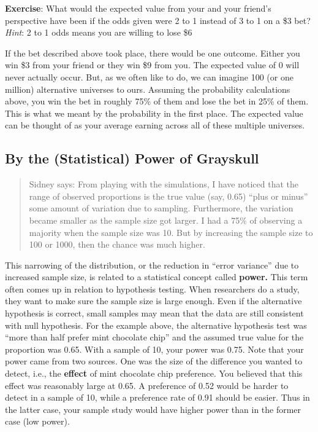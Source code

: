\documentclass[
  openany]{book}
\begin{document}
\textbf{Exercise}: What would the expected value from your and your friend's perspective have been if the odds given were 2 to 1 instead of 3 to 1 on a \$3 bet? \emph{Hint}: 2 to 1 odds means you are willing to lose \$6

If the bet described above took place, there would be one outcome. Either you win \$3 from your friend or they win \$9 from you. The expected value of 0 will never actually occur. But, as we often like to do, we can imagine 100 (or one million) alternative universes to ours. Assuming the probability calculations above, you win the bet in roughly 75\% of them and lose the bet in 25\% of them. This is what we meant by the probability in the first place. The expected value can be thought of as your average earning across all of these multiple universes.

\hypertarget{by-the-statistical-power-of-grayskull}{%
\subsection*{By the (Statistical) Power of Grayskull}\label{by-the-statistical-power-of-grayskull}}

\begin{quote}
Sidney says: From playing with the simulations, I have noticed that the range of observed proportions is the true value (say, 0.65) ``plus or minus'' some amount of variation due to sampling. Furthermore, the variation became smaller as the sample size got larger. I had a 75\% of observing a majority when the sample size was 10. But by increasing the sample size to 100 or 1000, then the chance was much higher.
\end{quote}

This narrowing of the distribution, or the reduction in ``error variance'' due to increased sample size, is related to a statistical concept called \textbf{power.} This term often comes up in relation to hypothesis testing. When researchers do a study, they want to make sure the sample size is large enough. Even if the alternative hypothesis is correct, small samples may mean that the data are still consistent with null hypothesis. For the example above, the alternative hypothesis test was ``more than half prefer mint chocolate chip'' and the assumed true value for the proportion was 0.65. With a sample of 10, your power was 0.75. Note that your power came from two sources. One was the size of the difference you wanted to detect, i.e., the \textbf{effect} of mint chocolate chip preference. You believed that this effect was reasonably large at 0.65. A preference of 0.52 would be harder to detect in a sample of 10, while a preference rate of 0.91 should be easier. Thus in the latter case, your sample study would have higher power than in the former case (low power).
\end{document}
